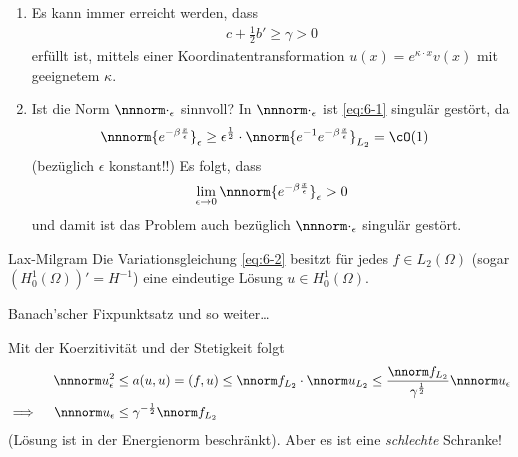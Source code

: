\begin{bemerkung*}
  \begin{enumerate}
  \item   Es kann immer erreicht werden, dass
  \begin{align*}
    c + \frac 12 b' \geq \gamma > 0
  \end{align*}
  erfüllt ist, mittels einer Koordinatentransformation $u(x) = e^{\kappa \cdot x} v(x)$ mit geeignetem $\kappa$. 
\item Ist die Norm $\nnnorm \cdot_{\epsilon}$ sinnvoll? In  $\nnnorm \cdot_{\epsilon}$ ist \eqref{eq:6-1} singulär gestört, da
  \begin{align*}
     \nnnorm {e^{- \beta \frac x \epsilon}}_{\epsilon} &\geq\epsilon^{\frac 12}\cdot \nnorm{e^{-1} e^{- \beta \frac x \epsilon}}_{L_{2}} = \cO(1)
  \end{align*}
(bezüglich $\epsilon$ konstant!!) Es folgt, dass
\begin{align*}
   \lim_{\epsilon \to 0}    \nnnorm {e^{- \beta \frac x \epsilon}}_{\epsilon}  > 0
\end{align*}
und damit ist das Problem auch bezüglich $\nnnorm \cdot _{\epsilon}$ singulär gestört. 
  \end{enumerate}
\end{bemerkung*}
\begin{lemma}\label{lem:6-1} Lax-Milgram
  Die Variationsgleichung \eqref{eq:6-2} besitzt für jedes $f \in L_{2}(\Omega)$ (sogar $(H_{0}^{1}(\Omega))' = H^{-1}$) eine eindeutige Lösung $u \in H_{0}^{1}(\Omega)$. 
\end{lemma}
\begin{beweis}
  Banach'scher Fixpunktsatz und so weiter\dots
\end{beweis}
\begin{bemerkung*}
  Mit der Koerzitivität und der Stetigkeit folgt
\begin{align*}
  \nnnorm u_{\epsilon}^{2} &\leq a(u, u) = (f, u) \leq \nnorm f_{L_{2}} \cdot \nnorm u_{L_{2}} \leq \frac {\nnorm f_{L_{2}}}{\gamma^{\frac 1 2}} \nnnorm u_{\epsilon}\\
\implies \quad \nnnorm u_{\epsilon} &\leq \gamma^{-\frac 1 2} \nnorm f_{L_{2}}
\end{align*}
(Lösung ist in der Energienorm beschränkt). Aber es ist eine \emph{schlechte} Schranke! 
\end{bemerkung*}

